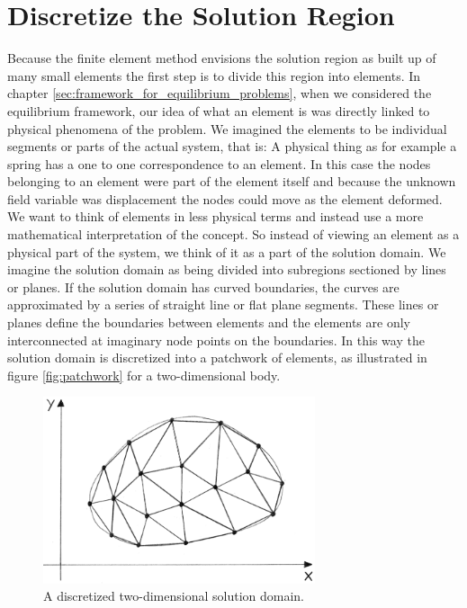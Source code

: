 \section{Discretize the Solution Region} %
\label{sec:discretize-the-continuum}
Because the finite element method envisions the solution region as
built up of many small elements the first step is to divide this
region into elements.
%
In chapter \vref{sec:framework_for_equilibrium_problems}, when
we considered the equilibrium framework,
our idea of what an element is was directly linked to physical
phenomena of the problem.
%
We imagined the elements to be individual segments or parts of the
actual system, that is: A physical thing as for example a spring has a
one to one correspondence to an element.
%
In this case the nodes belonging to an element were part of the element
itself and because the unknown field variable was displacement the
nodes could move as the element deformed.
%
We want to think of elements in less physical terms and instead use a
more mathematical interpretation of the concept.
%
So instead of viewing an element as a physical part of the system, we
think of it as a part of the solution domain. We imagine the
solution domain as being divided into subregions sectioned by lines or
planes. If the solution domain has curved boundaries, the curves are
approximated by a series of straight line or flat plane segments. These
lines or planes define the boundaries between elements and the
elements are only interconnected at imaginary node points on the
boundaries. In this way the solution domain is discretized into
a patchwork of elements, as illustrated in figure \vref{fig:patchwork}
for a two-dimensional body.
%

\begin{figure}
  \centering
  \includegraphics[width=8cm]{./images/finite_element_method_patchwork.png}
\caption{A discretized two-dimensional solution domain.}
\label{fig:patchwork}
\end{figure}

